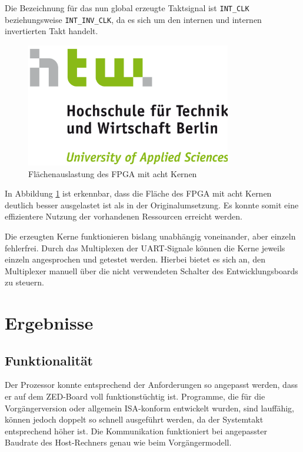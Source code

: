 \documentclass[11pt,a4paper,titlepage]{article}
\begin{document}
Die Bezeichnung für das nun global erzeugte Taktsignal ist \verb+INT_CLK+ beziehungsweise \verb+INT_INV_CLK+, da es sich um den internen und internen invertierten Takt handelt.

\begin{figure}[!ht]
\centering
\includegraphics[width=0.8\textwidth]{images/htw_hochschule.png}
\caption{Flächenauslastung des FPGA mit acht Kernen}
\label{img:FPGA_flaeche_8}
\end{figure}

In Abbildung \ref{img:FPGA_flaeche_8} ist erkennbar, dass die Fläche des FPGA mit acht Kernen deutlich besser ausgelastet ist als in der Originalumsetzung. Es konnte somit eine effizientere Nutzung der vorhandenen Ressourcen erreicht werden.

Die erzeugten Kerne funktionieren bislang unabhängig voneinander, aber einzeln  fehlerfrei. Durch das Multiplexen der UART-Signale können die Kerne jeweils einzeln angesprochen und getestet werden. Hierbei bietet es sich an, den Multiplexer manuell über die nicht verwendeten Schalter des Entwicklungsboards zu steuern.

\newpage
\section{Ergebnisse}

\subsection{Funktionalität}

Der Prozessor konnte entsprechend der Anforderungen so angepasst werden, dass er auf dem ZED-Board voll funktionstüchtig ist. Programme, die für die Vorgängerversion oder allgemein ISA-konform entwickelt wurden, sind lauffähig, können jedoch doppelt so schnell ausgeführt werden, da der Systemtakt entsprechend höher ist. Die Kommunikation funktioniert bei angepasster Baudrate des Host-Rechners genau wie beim Vorgängermodell.\\
\end{document}
